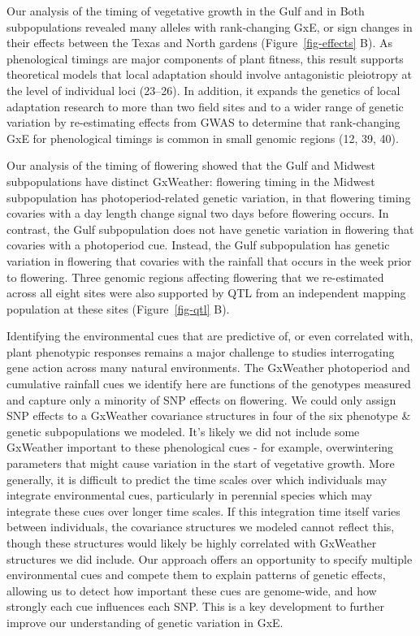 \documentclass[
  9pt,
  twocolumn,
  twoside]{pnas-new}
\begin{document}
Our analysis of the timing of vegetative growth in the Gulf and in Both
subpopulations revealed many alleles with rank-changing GxE, or sign
changes in their effects between the Texas and North gardens
(Figure~\ref{fig-effects} B). As phenological timings are major
components of plant fitness, this result supports theoretical models
that local adaptation should involve antagonistic pleiotropy at the
level of individual loci (23--26). In addition, it expands the genetics
of local adaptation research to more than two field sites and to a wider
range of genetic variation by re-estimating effects from GWAS to
determine that rank-changing GxE for phenological timings is common in
small genomic regions (12, 39, 40).

Our analysis of the timing of flowering showed that the Gulf and Midwest
subpopulations have distinct GxWeather: flowering timing in the Midwest
subpopulation has photoperiod-related genetic variation, in that
flowering timing covaries with a day length change signal two days
before flowering occurs. In contrast, the Gulf subpopulation does not
have genetic variation in flowering that covaries with a photoperiod
cue. Instead, the Gulf subpopulation has genetic variation in flowering
that covaries with the rainfall that occurs in the week prior to
flowering. Three genomic regions affecting flowering that we
re-estimated across all eight sites were also supported by QTL from an
independent mapping population at these sites (Figure~\ref{fig-qtl} B).

Identifying the environmental cues that are predictive of, or even
correlated with, plant phenotypic responses remains a major challenge to
studies interrogating gene action across many natural environments. The
GxWeather photoperiod and cumulative rainfall cues we identify here are
functions of the genotypes measured and capture only a minority of SNP
effects on flowering. We could only assign SNP effects to a GxWeather
covariance structures in four of the six phenotype \& genetic
subpopulations we modeled. It's likely we did not include some GxWeather
important to these phenological cues - for example, overwintering
parameters that might cause variation in the start of vegetative growth.
More generally, it is difficult to predict the time scales over which
individuals may integrate environmental cues, particularly in perennial
species which may integrate these cues over longer time scales. If this
integration time itself varies between individuals, the covariance
structures we modeled cannot reflect this, though these structures would
likely be highly correlated with GxWeather structures we did include.
Our approach offers an opportunity to specify multiple environmental
cues and compete them to explain patterns of genetic effects, allowing
us to detect how important these cues are genome-wide, and how strongly
each cue influences each SNP. This is a key development to further
improve our understanding of genetic variation in GxE.
\end{document}
